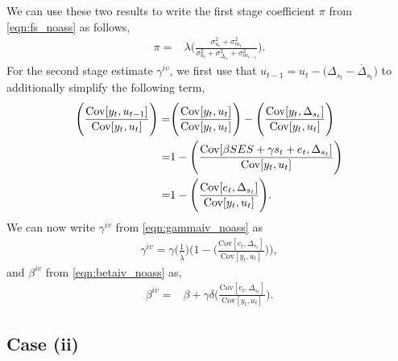 We can use these two results to write the first stage coefficient $\pi$ from \eqref{eqn:fs_noass} as follows,
\begin{align}\label{eqn:fs_ass2}
    \pi=&\lambda \Bigg( \frac{\sigma_{u_{t}}^2+\sigma_{m_{t}}^2}{\sigma_{u_{t}}^2+ \sigma_{\Delta_{s_t}}^2+\sigma_{m_{t-1}}^2}\Bigg).
\end{align}
%
For the second stage estimate $\gamma^{iv}$, we first use that $u_{t-1}=u_{t}-\big(\Delta_{s_{t}}-\overline{\Delta}_{s_{t}}\big)$ to additionally simplify the following term,
\begin{align}
    \Bigg(\frac{\mathrm{Cov}[y_{t},u_{t-1}]}{\mathrm{Cov}[y_{t},u_{t}]}\Bigg)=&  \Bigg(\frac{\mathrm{Cov}[y_{t},u_{t}]}{\mathrm{Cov}[y_{t},u_{t}]}\Bigg) - \Bigg(\frac{\mathrm{Cov}[y_{t},\Delta_{s_t}]}{\mathrm{Cov}[y_{t},u_{t}]}\Bigg) \\ \notag
     =&1-\Bigg(\frac{\mathrm{Cov}[\beta SES + \gamma s_{t}+e_{t},\Delta_{s_{t}}]}{\mathrm{Cov}[y_{t},u_{t}]}\Bigg) \\ \notag
    =&1 -\Bigg(\frac{\mathrm{Cov}[e_{t},\Delta_{s_{t}}]}{\mathrm{Cov}[y_{t},u_{t}]}\Bigg). 
\end{align}
We can now write $\gamma^{iv}$ from \eqref{eqn:gammaiv_noass} as
\begin{align}\label{eqn:gammaiv_ass2}
    \gamma^{iv}=\gamma \Bigg(\frac{1}{\widetilde{\lambda}}\Bigg)\Bigg(1 -\Bigg(\frac{\mathrm{Cov}[e_{t},\Delta_{s_{t}}]}{\mathrm{Cov}[y_{t},u_{t}]}\Bigg)\Bigg),
\end{align}
and $\beta^{iv}$ from \eqref{eqn:betaiv_noass} as,
\begin{align}\label{eqn:betaiv_ass2}
    \beta^{iv}=& \beta+\gamma\delta\Bigg(\frac{\mathrm{Cov}[e_{t},\Delta_{s_{t}}]}{\mathrm{Cov}[y_{t},u_{t}]}\Bigg).
\end{align}

\subsection{Case (ii)}

